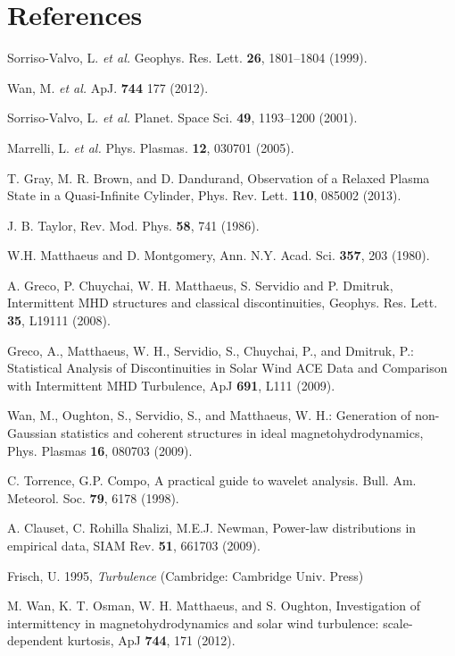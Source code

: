 \documentclass[aip,prl,amsmath,amssymb,reprint,superscriptaddress]{revtex4-1} %
\begin{document}
\section*{References}
\begin{thebibliography}{10}

Sorriso-Valvo, L. {\it et al.} Geophys. Res. Lett. {\bf 26}, 1801–1804 (1999).

Wan, M. {\it et al.} ApJ. {\bf 744} 177 (2012).

Sorriso-Valvo, L. {\it et al.} Planet. Space Sci. {\bf 49}, 1193–1200 (2001).

Marrelli, L. {\it et al.} Phys. Plasmas. {\bf 12}, 030701 (2005).

 T. Gray, M. R. Brown, and D. Dandurand, Observation of a Relaxed Plasma State in a Quasi-Infinite Cylinder, Phys. Rev. Lett. {\bf 110}, 085002 (2013). 

 J. B. Taylor, Rev. Mod. Phys. {\bf 58}, 741 (1986).

 W.H. Matthaeus and D. Montgomery, Ann. N.Y. Acad. Sci. {\bf 357}, 203 (1980).

A. Greco, P. Chuychai, W. H. Matthaeus, S. Servidio and P. Dmitruk, Intermittent MHD structures and classical discontinuities, Geophys. Res. Lett. {\bf 35}, L19111 (2008).

Greco, A., Matthaeus, W. H., Servidio, S., Chuychai, P., and Dmitruk, P.: Statistical Analysis of Discontinuities in Solar Wind ACE Data and Comparison with Intermittent MHD Turbulence, ApJ {\bf 691}, L111 (2009).

Wan, M., Oughton, S., Servidio, S., and Matthaeus, W. H.: Generation of non-Gaussian statistics and coherent structures in ideal magnetohydrodynamics, Phys. Plasmas {\bf 16}, 080703 (2009).

C. Torrence, G.P. Compo, A practical guide to wavelet analysis. Bull. Am. Meteorol. Soc. {\bf 79}, 6178 (1998).

A. Clauset, C. Rohilla Shalizi, M.E.J. Newman, Power-law distributions in empirical data, SIAM Rev. {\bf 51}, 661703 (2009).

Frisch, U. 1995, {\it Turbulence} (Cambridge: Cambridge Univ. Press)

M. Wan, K. T. Osman, W. H. Matthaeus, and S. Oughton, Investigation of intermittency in magnetohydrodynamics and solar wind turbulence: scale-dependent kurtosis, ApJ {\bf 744}, 171 (2012).


\end{thebibliography}
\end{document}
